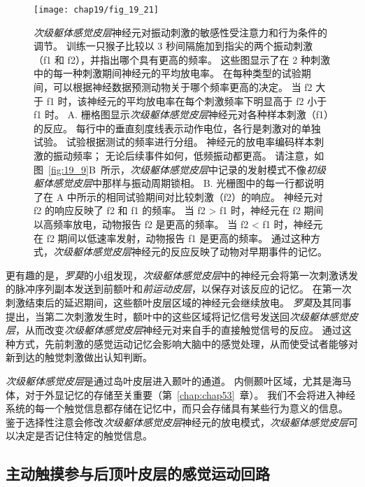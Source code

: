 \begin{figure}[htbp]
	\centering
	\texttt{[image: chap19/fig\_19\_21]}
	\caption{\textit{次级躯体感觉皮层}神经元对振动刺激的敏感性受注意力和行为条件的调节。
		训练一只猴子比较以 3 秒间隔施加到指尖的两个振动刺激（f1 和 f2），并指出哪个具有更高的频率。
		这些图显示了在 2 种刺激中的每一种刺激期间神经元的平均放电率。
		在每种类型的试验期间，可以根据神经数据预测动物关于哪个频率更高的决定。
		当 f2 大于 f1 时，该神经元的平均放电率在每个刺激频率下明显高于 f2 小于 f1 时\cite{romo2002neuronal}。
		A. 栅格图显示\textit{次级躯体感觉皮层}神经元对各种样本刺激（f1）的反应。
		每行中的垂直刻度线表示动作电位，各行是刺激对的单独试验。
		试验根据测试的频率进行分组。
		神经元的放电率编码样本刺激的振动频率； 无论后续事件如何，低频振动都更高。
		请注意，如图~\ref{fig:19_9}B~所示，\textit{次级躯体感觉皮层}中记录的发射模式不像\textit{初级躯体感觉皮层}中那样与振动周期锁相。
		B. 光栅图中的每一行都说明了在 A 中所示的相同试验期间对比较刺激（f2）的响应。
		神经元对 f2 的响应反映了 f2 和 f1 的频率。
		当 f2 > f1 时，神经元在 f2 期间以高频率放电，动物报告 f2 是更高的频率。
		当 f2 < f1 时，神经元在 f2 期间以低速率发射，动物报告 f1 是更高的频率。
		通过这种方式，\textit{次级躯体感觉皮层}神经元的反应反映了动物对早期事件的记忆。}
	\label{fig:19_21}
\end{figure}


更有趣的是，\textit{罗莫}的小组发现，\textit{次级躯体感觉皮层}中的神经元会将第一次刺激诱发的脉冲序列副本发送到前额叶和\textit{前运动皮层}，以保存对该反应的记忆。
在第一次刺激结束后的延迟期间，这些额叶皮层区域的神经元会继续放电。
\textit{罗莫}及其同事提出，当第二次刺激发生时，额叶中的这些区域将记忆信号发送回\textit{次级躯体感觉皮层}，从而改变\textit{次级躯体感觉皮层}神经元对来自手的直接触觉信号的反应。
通过这种方式，先前刺激的感觉运动记忆会影响大脑中的感觉处理，从而使受试者能够对新到达的触觉刺激做出认知判断。


\textit{次级躯体感觉皮层}是通过岛叶皮层进入颞叶的通道。
内侧颞叶区域，尤其是海马体，对于外显记忆的存储至关重要（第~\ref{chap:chap53}~章）。
我们不会将进入神经系统的每一个触觉信息都存储在记忆中，而只会存储具有某些行为意义的信息。
鉴于选择性注意会修改\textit{次级躯体感觉皮层}神经元的放电模式，\textit{次级躯体感觉皮层}可以决定是否记住特定的触觉信息。



\subsection{主动触摸参与后顶叶皮层的感觉运动回路}

